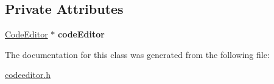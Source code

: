 \subsection*{Private Attributes}
\begin{DoxyCompactItemize}
\item 
\hypertarget{class_line_number_area_ae1dcaf51cd365f6137d1beecc1e5af80}{}\hyperlink{class_code_editor}{Code\+Editor} $\ast$ {\bfseries code\+Editor}\label{class_line_number_area_ae1dcaf51cd365f6137d1beecc1e5af80}

\end{DoxyCompactItemize}


The documentation for this class was generated from the following file\+:\begin{DoxyCompactItemize}
\item 
\hyperlink{codeeditor_8h}{codeeditor.\+h}\end{DoxyCompactItemize}
